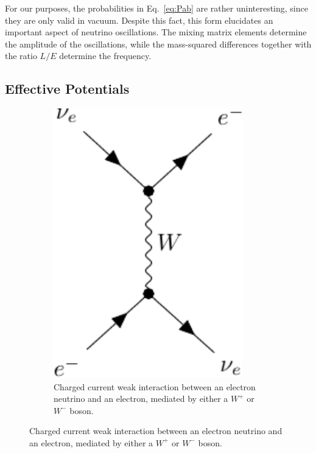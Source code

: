 For our purposes, the probabilities in Eq.~\ref{eq:Pab} are rather uninteresting, since they are only valid in vacuum.
Despite this fact, this form elucidates an important aspect of neutrino oscillations. The mixing matrix elements
determine the amplitude of the oscillations, while the mass-squared differences together with the ratio $L/E$ determine the 
frequency. 

\subsection{Effective Potentials}

\begin{figure}
    \centering
    \begin{subfigure}{0.3\textwidth}
        \includegraphics[width=0.9\textwidth]{figures/w-boson.pdf} 
        \caption{Charged current weak interaction between an electron neutrino and an electron,
        mediated by either a $W^+$ or $W^-$ boson.}
    \end{subfigure}

\end{figure}
